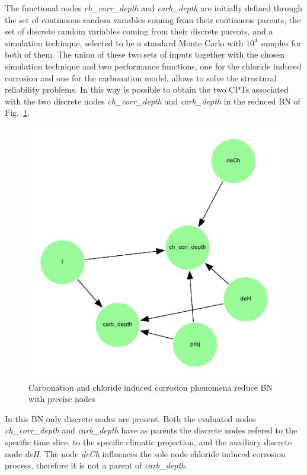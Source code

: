 The functional nodes \textit{ch\_corr\_depth} and \textit{carb\_depth} are initially defined through the set of continuous random variables coming from their continuous parents, the set of discrete random variables coming from their discrete parents, and a simulation techinque, selected to be a standard Monte Carlo with $10^4$ samples for both of them. The union of these two sets of inputs together with the chosen simulation technique and two performance functions, one for the chloride induced corrosion and one for the carbonation model, allows to solve the structural reliability problems. In this way is possible to obtain the two CPTs associated with the two discrete nodes \textit{ch\_corr\_depth} and \textit{carb\_depth} in the reduced BN of Fig.~\ref{fig:precise_rbn}. 

\begin{figure}[H]
    \centering
    \includegraphics[width=\linewidth]{imgs/pdfs/13_total_rbn_precise.pdf}
    \caption{Carbonation and chloride induced corrosion phenomena reduce BN with precise nodes}\label{fig:precise_rbn}
\end{figure}

In this BN only discrete nodes are present. Both the evaluated nodes  \textit{ch\_corr\_depth} and \textit{carb\_depth} have as parents the discrete nodes refered to the specific time slice, to the specific climatic projection, and the auxiliary discrete node \textit{deH}. The node \textit{deCh} influences the sole node chloride induced corrosion process, therefore it is not a parent of \textit{carb\_depth}.

